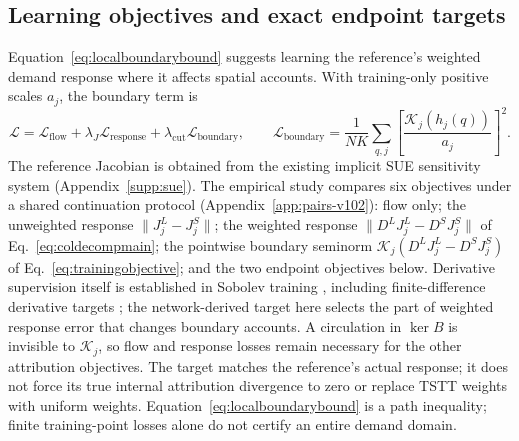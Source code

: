 \subsection{Learning objectives and exact endpoint targets}\label{app:learning-objectives}
Equation~\eqref{eq:localboundarybound} suggests learning the reference's weighted demand response
where it affects spatial accounts. With training-only positive scales
$a_j$, the boundary term is
\begin{equation}
\mathcal L=\mathcal L_{\mathrm{flow}}+\lambda_J\mathcal L_{\mathrm{response}}
+\lambda_{\mathrm{cut}}\mathcal L_{\mathrm{boundary}},\qquad
\mathcal L_{\mathrm{boundary}}
=\frac1{NK}\sum_{q,j}\left[\frac{\mathcal K_j(h_j(q))}{a_j}\right]^2.
\label{eq:trainingobjective}
\end{equation}
The reference Jacobian is obtained from the existing implicit SUE
sensitivity system (Appendix~\ref{supp:sue}). The empirical study
compares six objectives under a shared continuation protocol
(Appendix~\ref{app:pairs-v102}): flow only; the unweighted response
$\|J_j^L-J_j^S\|$; the weighted response $\|D^LJ_j^L-D^SJ_j^S\|$ of
Eq.~\eqref{eq:coldecompmain}; the pointwise boundary seminorm
$\mathcal K_j(D^LJ_j^L-D^SJ_j^S)$ of Eq.~\eqref{eq:trainingobjective};
and the two endpoint objectives below.
Derivative supervision itself is established in Sobolev training
\citep{czarnecki2017sobolev}, including finite-difference derivative targets
\citep{yuan2022sobolev}; the network-derived target here selects the
part of weighted response error that changes boundary accounts.
A circulation in $\ker B$ is invisible to $\mathcal K_j$, so flow and
response losses remain necessary for the other attribution objectives.
The target matches the reference's actual response; it does not force
its true internal attribution divergence to zero or replace TSTT weights
with uniform weights. Equation~\eqref{eq:localboundarybound} is a path
inequality; finite training-point losses alone do not certify an entire
demand domain.



